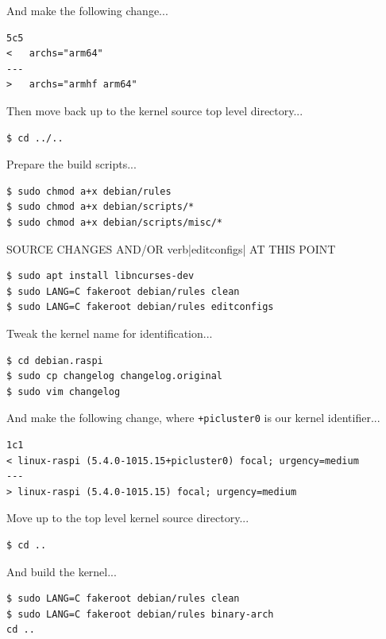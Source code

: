 \documentclass{report}
\begin{document}
And make the following change...

\lstset{style=listing}
\begin{lstlisting}[caption=diff kernelconfig kernelconfig.original, numbers=none]
5c5
< 	archs="arm64"
---
> 	archs="armhf arm64"
\end{lstlisting}

Then move back up to the kernel source top level directory...

\lstset{style=type}
\begin{lstlisting}
$ cd ../..
\end{lstlisting}

Prepare the build scripts...

\lstset{style=type}
\begin{lstlisting}
$ sudo chmod a+x debian/rules
$ sudo chmod a+x debian/scripts/*
$ sudo chmod a+x debian/scripts/misc/*
\end{lstlisting}

SOURCE CHANGES AND/OR verb|editconfigs| AT THIS POINT

\lstset{style=type}
\begin{lstlisting}
$ sudo apt install libncurses-dev
$ sudo LANG=C fakeroot debian/rules clean
$ sudo LANG=C fakeroot debian/rules editconfigs
\end{lstlisting}

Tweak the kernel name for identification...

\lstset{style=type}
\begin{lstlisting}
$ cd debian.raspi
$ sudo cp changelog changelog.original
$ sudo vim changelog
\end{lstlisting}

And make the following change, where \verb|+picluster0| is our kernel identifier...

\lstset{style=listing}
\begin{lstlisting}[caption=diff changelog changelog.original, numbers=none]
1c1
< linux-raspi (5.4.0-1015.15+picluster0) focal; urgency=medium
---
> linux-raspi (5.4.0-1015.15) focal; urgency=medium
\end{lstlisting}

Move up to the top level kernel source directory...

\lstset{style=type}
\begin{lstlisting}
$ cd ..
\end{lstlisting}

And build the kernel...

\lstset{style=type}
\begin{lstlisting}
$ sudo LANG=C fakeroot debian/rules clean
$ sudo LANG=C fakeroot debian/rules binary-arch
cd ..
\end{lstlisting}
\end{document}
